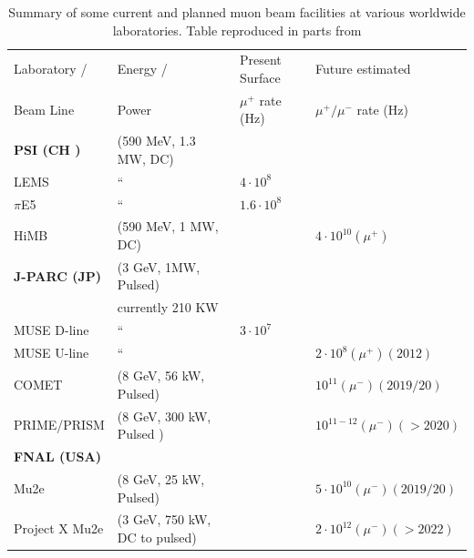 \begin{table}[ht]
\begin{center}
\caption{Summary of some current and planned muon beam facilities at various worldwide laboratories. Table reproduced in parts from \cite{Blondel:2013ia} \label{table:cl:muonrates}}
{ \begin{tabular}{llll}\\
\hline
Laboratory / & Energy / & Present Surface  & Future estimated  \\
Beam Line & Power & $\mu^{+}$ rate (Hz) & $\mu^{+}/\mu^{-}$ rate (Hz) \\
\hline
\bf{PSI (CH )} & (590 MeV, 1.3 MW, DC) &  & \\
LEMS & `` & $4 \cdot 10^8$ &  \\
$\pi$E5 & `` & $1.6 \cdot 10^8$  & \\
HiMB & (590 MeV, 1 MW, DC) & & $4\cdot 10^{10} (\mu^{+})$ \\
\hline
\bf{J-PARC (JP)} & (3 GeV, 1MW, Pulsed) & & \\
 & currently 210 KW &  & \\
 MUSE D-line & `` & $3 \cdot 10^7$ & \\
 MUSE U-line & `` &  & $2\cdot 10^8 (\mu^{+})(2012)$ \\
 COMET & (8 GeV, 56 kW, Pulsed) & & $10^{11} (\mu^{-})(2019/20) $\\
 PRIME/PRISM & (8 GeV, 300 kW, Pulsed ) & & $10^{11-12}(\mu^{-}) ( > 2020)$ \\
 \hline
 \bf{FNAL (USA)} & &  & \\
 Mu2e & (8 GeV, 25 kW, Pulsed) & & $5\cdot 10^{10} (\mu^{-})(2019/20) $\\ 
 Project X Mu2e & (3 GeV, 750 kW, DC to pulsed) & & $2\cdot 10^{12} (\mu^{-})(>2022)$ \\
\hline 
\end{tabular}}
\end{center}
\end{table}

